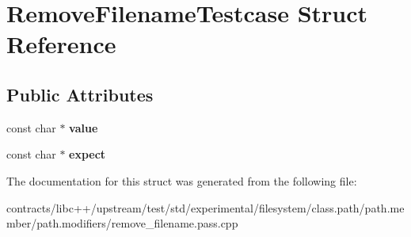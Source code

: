 \hypertarget{struct_remove_filename_testcase}{}\section{Remove\+Filename\+Testcase Struct Reference}
\label{struct_remove_filename_testcase}
\subsection*{Public Attributes}
\begin{DoxyCompactItemize}
\item 
\mbox{\label{struct_remove_filename_testcase_a088efc88038d30e105cca53231f6da82}} 
const char $\ast$ {\bfseries value}
\item 
\mbox{\label{struct_remove_filename_testcase_a092bfc0bd33926e2b4f00244b04ad4df}} 
const char $\ast$ {\bfseries expect}
\end{DoxyCompactItemize}


The documentation for this struct was generated from the following file\+:\begin{DoxyCompactItemize}
\item 
contracts/libc++/upstream/test/std/experimental/filesystem/class.\+path/path.\+member/path.\+modifiers/remove\+\_\+filename.\+pass.\+cpp\end{DoxyCompactItemize}
